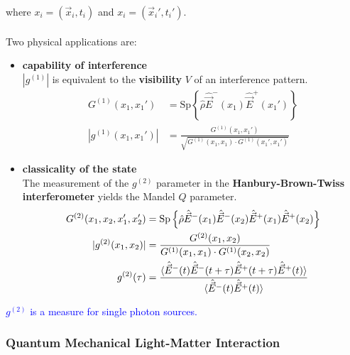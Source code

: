 \documentclass{article}
\newcommand{\lrschweif}[1]{\left\{#1\right\}}
\begin{document}
where $x_i = (\vec{x}_i,t_i)$ and $x_i = (\vec{x}_i',t_i')$.\\
\\
Two physical applications are:
	\begin{itemize}
		\item \textbf{capability of interference}\\
		$|g^{(1)}|$ is equivalent to the \textbf{visibility} $V$ of an interference pattern.
			\begin{align}
				G^{(1)}(x_1,x_1') &= \text{Sp} \lrschweif{ \hat{\rho} \hat{\vec{E}}^-(x_1) \hat{\vec{E}}^+(x_1') } \\
				|g^{(1)}(x_1,x_1')| &= \frac{ G^{(1)}(x_1,x_1') }{ \sqrt{ G^{(1)}(x_1,x_1) \cdot G^{(1)}(x_1',x_1') } }
			\end{align}
		
		
		\item \textbf{classicality of the state}\\
		The measurement of the $g^{(2)}$ parameter in the \textbf{Hanbury-Brown-Twiss interferometer} yields the Mandel $Q$ parameter.
			\begin{align}
				G^{(2)}(x_1,x_2,x_1',x_2') &= \text{Sp} \lrschweif{ \hat{\rho} \hat{\vec{E}}^-(x_1) \hat{\vec{E}}^-(x_2) \hat{\vec{E}}^+(x_1) \hat{\vec{E}}^+(x_2) } \\
				|g^{(2)}(x_1,x_2)| &= \frac{G^{(2)}(x_1,x_2)}{ G^{(1)}(x_1,x_1) \cdot G^{(1)}(x_2,x_2) } \\
				g^{(2)}(\tau) &= \frac{ \braket{ \hat{\vec{E}}^-(t) \hat{\vec{E}}^-(t+\tau) \hat{\vec{E}}^+(t+\tau) \hat{\vec{E}}^+(t) } }{ \braket{ \hat{\vec{E}}^-(t) \hat{\vec{E}}^+(t) } }
			\end{align}
	\end{itemize}

\textcolor{blue}{$g^{(2)}$ is a measure for single photon sources.}


\newpage


\subsubsection{Quantum Mechanical Light-Matter Interaction}
\end{document}
